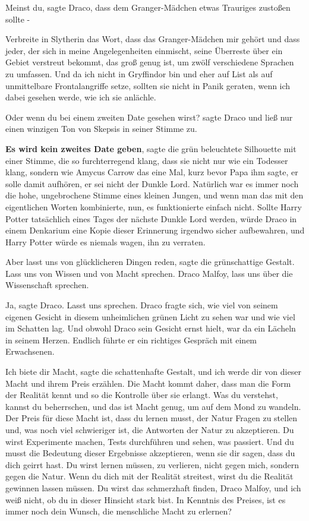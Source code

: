 \glqq{}Meinst du\grqq{}, sagte Draco, \glqq{}dass dem Granger-Mädchen etwas
Trauriges zustoßen sollte -\grqq{}

\glqq{}Verbreite in Slytherin das Wort, dass das Granger-Mädchen mir gehört und
dass jeder, der sich in meine Angelegenheiten einmischt, seine Überreste über
ein Gebiet verstreut bekommt, das groß genug ist, um zwölf verschiedene Sprachen
zu umfassen. Und da ich nicht in Gryffindor bin und eher auf List als auf
unmittelbare Frontalangriffe setze, sollten sie nicht in Panik geraten, wenn ich
dabei gesehen werde, wie ich sie anlächle.\grqq{}

\glqq{}Oder wenn du bei einem zweiten Date gesehen wirst?\grqq{} sagte Draco und
ließ nur einen winzigen Ton von Skepsis in seiner Stimme zu.

\textbf{\glqq{}Es wird kein zweites Date geben\grqq{}}, sagte die grün
beleuchtete Silhouette mit einer Stimme, die so furchterregend klang, dass sie
nicht nur wie ein Todesser klang, sondern wie Amycus Carrow das eine Mal, kurz
bevor Papa ihm sagte, er solle damit aufhören, er sei nicht der Dunkle Lord.
Natürlich war es immer noch die hohe, ungebrochene Stimme eines kleinen Jungen,
und wenn man das mit den eigentlichen Worten kombinierte, nun, es funktionierte
einfach nicht. Sollte Harry Potter tatsächlich eines Tages der nächste Dunkle
Lord werden, würde Draco in einem Denkarium eine Kopie dieser Erinnerung
irgendwo sicher aufbewahren, und Harry Potter würde es niemals wagen, ihn zu
verraten.

\glqq{}Aber lasst uns von glücklicheren Dingen reden\grqq{}, sagte die
grünschattige Gestalt. \glqq{}Lass uns von Wissen und von Macht sprechen. Draco
Malfoy, lass uns über die Wissenschaft sprechen.\grqq{}

\glqq{}Ja\grqq{}, sagte Draco. \glqq{}Lasst uns sprechen.\grqq{} Draco fragte
sich, wie viel von seinem eigenen Gesicht in diesem unheimlichen grünen Licht zu
sehen war und wie viel im Schatten lag. Und obwohl Draco sein Gesicht ernst
hielt, war da ein Lächeln in seinem Herzen. Endlich führte er ein richtiges
Gespräch mit einem Erwachsenen.

\glqq{}Ich biete dir Macht\grqq{}, sagte die schattenhafte Gestalt, \glqq{}und ich
werde dir von dieser Macht und ihrem Preis erzählen. Die Macht kommt daher, dass
man die Form der Realität kennt und so die Kontrolle über sie erlangt. Was du
verstehst, kannst du beherrschen, und das ist Macht genug, um auf dem Mond zu
wandeln. Der Preis für diese Macht ist, dass du lernen musst, der Natur Fragen
zu stellen und, was noch viel schwieriger ist, die Antworten der Natur zu
akzeptieren. Du wirst Experimente machen, Tests durchführen und sehen, was
passiert. Und du musst die Bedeutung dieser Ergebnisse akzeptieren, wenn sie dir
sagen, dass du dich geirrt hast. Du wirst lernen müssen, zu verlieren, nicht
gegen mich, sondern gegen die Natur. Wenn du dich mit der Realität streitest,
wirst du die Realität gewinnen lassen müssen. Du wirst das schmerzhaft finden,
Draco Malfoy, und ich weiß nicht, ob du in dieser Hinsicht stark bist. In
Kenntnis des Preises, ist es immer noch dein Wunsch, die menschliche Macht zu
erlernen?\grqq{}

